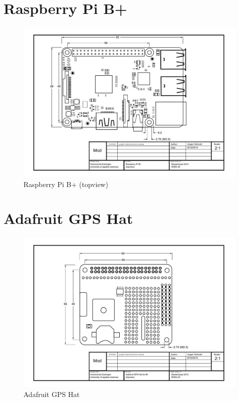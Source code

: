 \section{Raspberry Pi B+}
\label{sec:goals:rpib}
\begin{figure}[H]
    \centering
    \includegraphics[width=\textwidth]{fig/ch-rpi-hardware/A4_tech_draw_topview_rpi}
    \caption{Raspberry Pi B+ (topview)}
    \label{fig:parts:rpi_topview}
\end{figure}

\newpage
\section{Adafruit GPS Hat}
\label{sec:goals:gpshat}
\begin{figure}[H]
    \centering
    \includegraphics[width=\textwidth]{fig/ch-rpi-hardware/A4_tech_draw_topview_gpshat}
    \caption{Adafruit GPS Hat}
    \label{fig:parts:gps_topview}
\end{figure}

